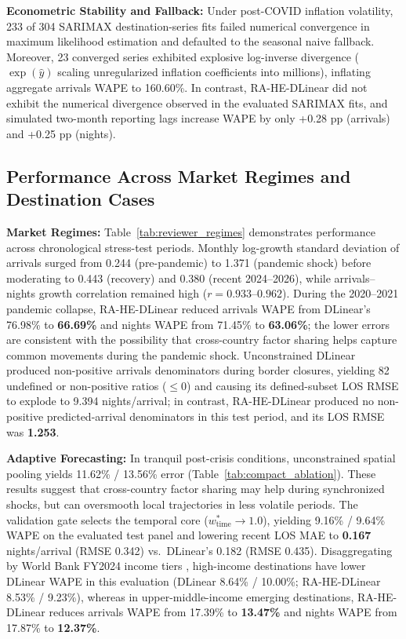 \documentclass[sigconf]{acmart}
\begin{document}
\textbf{Econometric Stability and Fallback:} Under post-COVID inflation volatility, 233 of 304 SARIMAX destination-series fits failed numerical convergence in maximum likelihood estimation and defaulted to the seasonal naive fallback. Moreover, 23 converged series exhibited explosive log-inverse divergence ($\exp(\hat{y})$ scaling unregularized inflation coefficients into millions), inflating aggregate arrivals WAPE to 160.60\%. In contrast, RA-HE-DLinear did not exhibit the numerical divergence observed in the evaluated SARIMAX fits, and simulated two-month reporting lags increase WAPE by only +0.28 pp (arrivals) and +0.25 pp (nights).

\subsection{Performance Across Market Regimes and Destination Cases}

\textbf{Market Regimes:} Table~\ref{tab:reviewer_regimes} demonstrates performance across chronological stress-test periods. Monthly log-growth standard deviation of arrivals surged from 0.244 (pre-pandemic) to 1.371 (pandemic shock) before moderating to 0.443 (recovery) and 0.380 (recent 2024--2026), while arrivals--nights growth correlation remained high ($r=0.933$--$0.962$). During the 2020--2021 pandemic collapse, RA-HE-DLinear reduced arrivals WAPE from DLinear's 76.98\% to \textbf{66.69\%} and nights WAPE from 71.45\% to \textbf{63.06\%}; the lower errors are consistent with the possibility that cross-country factor sharing helps capture common movements during the pandemic shock. Unconstrained DLinear produced non-positive arrivals denominators during border closures, yielding 82 undefined or non-positive ratios ($\le 0$) and causing its defined-subset LOS RMSE to explode to 9.394 nights/arrival; in contrast, RA-HE-DLinear produced no non-positive predicted-arrival denominators in this test period, and its LOS RMSE was \textbf{1.253}.



\enlargethispage{20pt}
\textbf{Adaptive Forecasting:} In tranquil post-crisis conditions, unconstrained spatial pooling yields 11.62\% / 13.56\% error (Table~\ref{tab:compact_ablation}). These results suggest that cross-country factor sharing may help during synchronized shocks, but can oversmooth local trajectories in less volatile periods. The validation gate selects the temporal core ($w_{\text{time}}^*\to 1.0$), yielding 9.16\% / 9.64\% WAPE on the evaluated test panel and lowering recent LOS MAE to \textbf{0.167} nights/arrival (RMSE 0.342) vs.\ DLinear's 0.182 (RMSE 0.435). Disaggregating by World Bank FY2024 income tiers \cite{worldbank_income_fy24}, high-income destinations have lower DLinear WAPE in this evaluation (DLinear 8.64\% / 10.00\%; RA-HE-DLinear 8.53\% / 9.23\%), whereas in upper-middle-income emerging destinations, RA-HE-DLinear reduces arrivals WAPE from 17.39\% to \textbf{13.47\%} and nights WAPE from 17.87\% to \textbf{12.37\%}.
\end{document}
